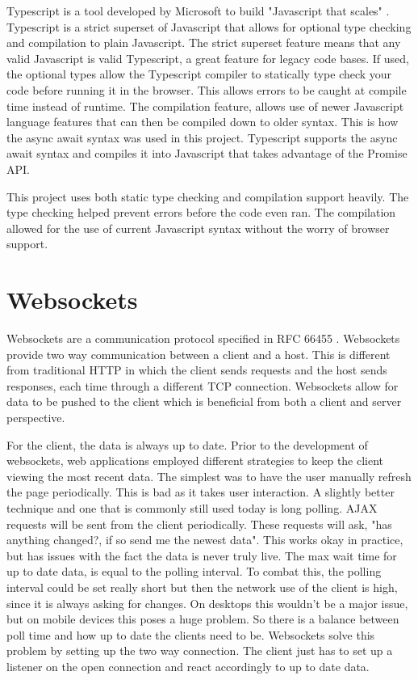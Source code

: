 Typescript is a tool developed by Microsoft to build "Javascript that scales" \cite{typescript}.
Typescript is a strict superset of Javascript that allows for optional type checking and compilation to plain Javascript. The strict superset feature means that any valid Javascript is valid Typescript, a great feature for legacy code bases. If used, the optional types allow the Typescript compiler to statically type check your code before running it in the browser. This allows errors to be caught at compile time instead of runtime. The compilation feature, allows use of newer Javascript language features that can then be compiled down to older syntax. This is how the async await syntax was used in this project. Typescript supports the async await syntax and compiles it into Javascript that takes advantage of the Promise API. 


This project uses both static type checking and compilation support heavily. The type checking helped prevent errors before the code even ran. The compilation allowed for the use of current Javascript syntax without the worry of browser support. 


\section{Websockets}


Websockets are a communication protocol specified in RFC 66455 \cite{websocket-rfc}. Websockets provide two way communication between a client and a host. This is different from traditional HTTP in which the client sends requests and the host sends responses, each time through a different TCP connection. Websockets allow for data to be pushed to the client which is beneficial from both a client and server perspective.


For the client, the data is always up to date. Prior to the development of websockets, web applications employed different strategies to keep the client viewing the most recent data. The simplest was to have the user manually refresh the page periodically. This is bad as it takes user interaction. A slightly better technique and one that is commonly still used today is long polling. AJAX requests will be sent from the client periodically. These requests will ask, "has anything changed?, if so send me the newest data". This works okay in practice, but has issues with the fact the data is never truly live. The max wait time for up to date data, is equal to the polling interval. To combat this, the polling interval could be set really short but then the network use of the client is high, since it is always asking for changes. On desktops this wouldn't be a major issue, but on mobile devices this poses a huge problem. So there is a balance between poll time and how up to date the clients need to be. Websockets solve this problem by setting up the two way connection. The client just has to set up a listener on the open connection and react accordingly to up to date data.


